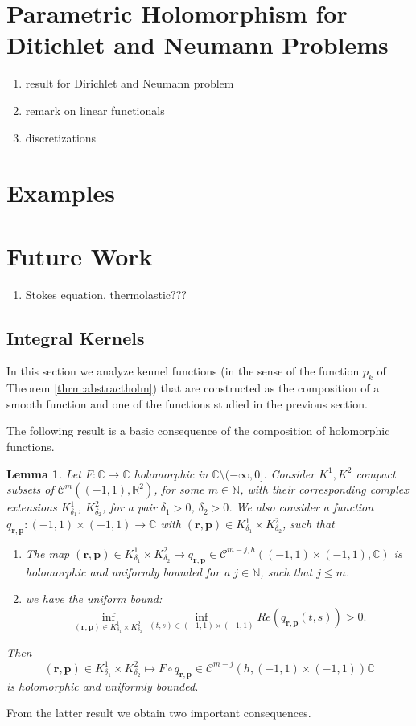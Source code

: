 \documentclass{article}
\newtheorem{lemma}[theorem]{Lemma}
\newcommand{\IC}{{\mathbb C}}
\newcommand{\IN}{{\mathbb N}}
\newcommand{\IR}{{\mathbb R}}
\newcommand{\bp}{{\bm p}}
\newcommand{\cmspace}[3]{\mathcal{C}^{#1} \left( #2, #3 \right)}
\newcommand{\cmspaceh}[4]{\mathcal{C}^{#1,#2} \left( #3, #4 \right)}
\newcommand{\br}{\bm{r}}
\begin{document}
\section{Parametric Holomorphism for Ditichlet and Neumann Problems}
\begin{enumerate}
\item 
result for Dirichlet and Neumann problem 
\item 
remark on linear functionals
\item 
discretizations
\end{enumerate}

\section{Examples}

\section{Future Work}
\begin{enumerate}
\item 
Stokes equation, thermolastic???
\end{enumerate}


\subsection{Integral Kernels}
In this section we analyze kennel functions (in the sense of the function $p_k$ of Theorem \ref{thrm:abstractholm}) that are constructed as the composition of a smooth function and one of the functions studied in the previous section. 

The following result is a basic consequence of the composition of holomorphic functions. 

\begin{lemma}
\label{lemma:Fcircq}
Let $F :\IC \rightarrow \IC$ holomorphic in $\IC \setminus (-\infty,0]$. Consider $K^1, K^2$ compact subsets of $\cmspace{m}{(-1,1)}{\IR^2}$, for some $m \in \IN$, with their corresponding complex extensions $K^1_{\delta_1}$, $K^2_{\delta_2}$, for a pair $\delta_1 >0$, $\delta_2>0$. We also consider a function $q_{\br,\bp} :(-1,1)\times (-1,1) \rightarrow \IC$ with $(\br,\bp) \in K^1_{\delta_1} \times K^2_{\delta_2}$, such that  
\begin{enumerate}
\item 
The map $(\br,\bp)  \in K^1_{\delta_1} \times K^2_{\delta_2} \mapsto q_{\br,\bp} \in \cmspaceh{m-j}{h}{(-1,1)\times(-1,1)}{\IC}$ is holomorphic and uniformly bounded for a $j\in \IN$, such that $j\leq m$. 
\item we have the uniform bound: 
$$
\inf_{(\br,\bp) \in K_{\delta_1}^1 \times K_{\delta_2}^2} \inf_{(t,s) \in (-1,1)\times(-1,1)} Re( q_{\br,\bp}(t,s))>0.
$$
\end{enumerate}
Then 
$$(\br,\bp)  \in K^1_{\delta_1} \times K^2_{\delta_2} \mapsto  F \circ q_{\br,\bp} \in \cmspace{m-j}{h}{(-1,1)\times(-1,1)}{\IC}$$
is holomorphic and uniformly bounded.
\end{lemma} 
From the latter result we obtain two important consequences. 
\end{document}
